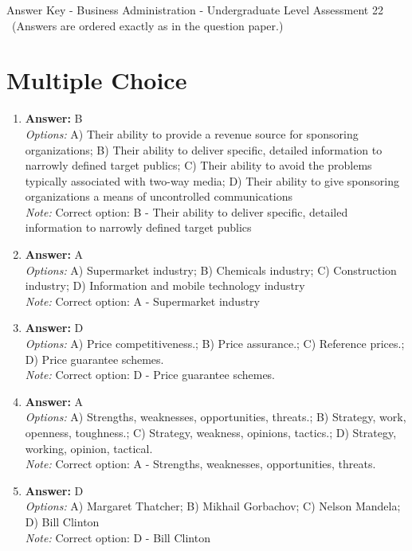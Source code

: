 \documentclass[12pt]{article}
\begin{document}
\begin{center}
Answer Key - Business Administration - Undergraduate Level Assessment 22 \
\small (Answers are ordered exactly as in the question paper.)
\end{center}

\section*{Multiple Choice}
\begin{enumerate}[label=\arabic*.]
\item \textbf{Answer:} B
\\ \textit{Options:} A) Their ability to provide a revenue source for sponsoring organizations; B) Their ability to deliver specific, detailed information to narrowly defined target publics; C) Their ability to avoid the problems typically associated with two-way media; D) Their ability to give sponsoring organizations a means of uncontrolled communications
\\ \textit{Note:} Correct option: B - Their ability to deliver specific, detailed information to narrowly defined target publics
\item \textbf{Answer:} A
\\ \textit{Options:} A) Supermarket industry; B) Chemicals industry; C) Construction industry; D) Information and mobile technology industry
\\ \textit{Note:} Correct option: A - Supermarket industry
\item \textbf{Answer:} D
\\ \textit{Options:} A) Price competitiveness.; B) Price assurance.; C) Reference prices.; D) Price guarantee schemes.
\\ \textit{Note:} Correct option: D - Price guarantee schemes.
\item \textbf{Answer:} A
\\ \textit{Options:} A) Strengths, weaknesses, opportunities, threats.; B) Strategy, work, openness, toughness.; C) Strategy, weakness, opinions, tactics.; D) Strategy, working, opinion, tactical.
\\ \textit{Note:} Correct option: A - Strengths, weaknesses, opportunities, threats.
\item \textbf{Answer:} D
\\ \textit{Options:} A) Margaret Thatcher; B) Mikhail Gorbachov; C) Nelson Mandela; D) Bill Clinton
\\ \textit{Note:} Correct option: D - Bill Clinton
\end{enumerate}
\end{document}
